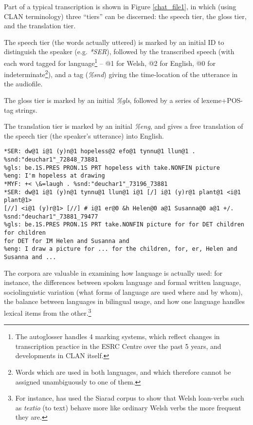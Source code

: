 \documentclass[11pt]{article}
\begin{document}
Part of a typical transcription is shown in Figure \ref{chat_file1}, in which (using CLAN terminology) three ``tiers'' can be discerned: the speech tier, the gloss tier, and the translation tier.

The speech tier (the words actually uttered) is marked by an initial ID to distinguish the speaker (e.g. \textit{*SER}), followed by the transcribed speech (with each word tagged for language\footnote{The autoglosser handles 4 marking systems, which reflect changes in transcription practice in the ESRC Centre over the past 5 years, and developments in CLAN itself.} -- @1 for Welsh, @2 for English, @0 for indeterminate\footnote{Words which are used in both languages, and which therefore cannot be assigned unambiguously to one of them.}), and a tag (\textit{\%snd}) giving the time-location of the utterance in the audiofile.

The gloss tier is marked by an initial \textit{\%gls}, followed by a series of lexeme+POS-tag strings.

The translation tier is marked by an initial \textit{\%eng}, and gives a free translation of the speech tier (the speaker's utterance) into English.

\begin{figure*} 
\begin{footnotesize}
\begin{verbatim}
*SER: dw@1 i@1 (y)n@1 hopeless@2 efo@1 tynnu@1 llun@1 . %snd:"deuchar1"_72848_73881
%gls: be.1S.PRES PRON.1S PRT hopeless with take.NONFIN picture
%eng: I'm hopeless at drawing
*MYF: +< \&=laugh . %snd:"deuchar1"_73196_73881
*SER: dw@1 i@1 (y)n@1 tynnu@1 llun@1 i@1 [/] i@1 (y)r@1 plant@1 <i@1 plant@1> 
[//] <i@1 (y)r@1> [//] # i@1 er@0 &h Helen@0 a@1 Susanna@0 a@1 +/. 
%snd:"deuchar1"_73881_79477
%gls: be.1S.PRES PRON.1S PRT take.NONFIN picture for for DET children for children 
for DET for IM Helen and Susanna and
%eng: I draw a picture for ... for the children, for, er, Helen and Susanna and ...
\end{verbatim}
\end{footnotesize}
\caption{Excerpt from the file \textit{deuchar1} in the Siarad corpus (Welsh-English)}
\label{chat_file1}
\end{figure*}

The corpora are valuable in examining how language is actually used: for instance, the differences between spoken language and formal written language, sociolinguistic variation (what forms of language are used where and by whom), the balance between languages in bilingual usage, and how one language handles lexical items from the other.\footnote{For instance,  \cite{stammers2010} has used the Siarad corpus to show that Welsh loan-verbs such as \textit{textio} (to text) behave more like ordinary Welsh verbs the more frequent they are.}
\end{document}
